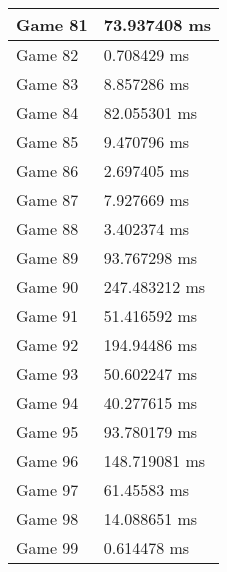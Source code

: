\begin{tabular}{|l|l|}
	Game 81 & 73.937408 ms \\ \hline
	Game 82 & 0.708429 ms \\ \hline
	Game 83 & 8.857286 ms \\ \hline
	Game 84 & 82.055301 ms \\ \hline
	Game 85 & 9.470796 ms \\ \hline
	Game 86 & 2.697405 ms \\ \hline
	Game 87 & 7.927669 ms \\ \hline
	Game 88 & 3.402374 ms \\ \hline
	Game 89 & 93.767298 ms \\ \hline
	Game 90 & 247.483212 ms \\ \hline
	Game 91 & 51.416592 ms \\ \hline
	Game 92 & 194.94486 ms \\ \hline
	Game 93 & 50.602247 ms \\ \hline
	Game 94 & 40.277615 ms \\ \hline
	Game 95 & 93.780179 ms \\ \hline
	Game 96 & 148.719081 ms \\ \hline
	Game 97 & 61.45583 ms \\ \hline
	Game 98 & 14.088651 ms \\ \hline
	Game 99 & 0.614478 ms \\ \hline
\end{tabular}
